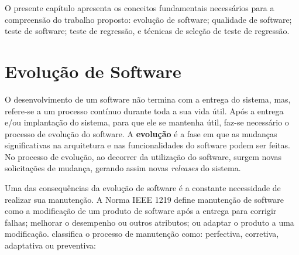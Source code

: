 
\acresetall 
O presente capítulo apresenta os conceitos fundamentais necessários para a compreensão do trabalho proposto: evolução de software; qualidade de software; teste de software; teste de regressão, e técnicas de seleção de teste de regressão.

\section{Evolução de Software}\label{sec:evolucaodesoftware}


O desenvolvimento de um software não termina com a entrega do sistema, mas, refere-se a um processo contínuo durante toda a sua vida útil. Após a entrega e/ou implantação do sistema, %
para que ele se mantenha útil, faz-se necessário o processo de evolução do software. A \textbf{evolução} é a fase em que as mudanças significativas na arquitetura e nas funcionalidades do software podem ser feitas. %
No processo de evolução, ao decorrer da utilização do software, surgem novas solicitações de mudança, gerando assim novas \textit{releases} do sistema.

Uma das consequências da evolução de software é a constante necessidade de realizar sua manutenção. A Norma IEEE 1219 \cite{257623} define manutenção de software como a modificação de um produto de software após a entrega para corrigir falhas; melhorar o desempenho ou outros atributos; ou adaptar o produto a uma modificação.  classifica o processo de manutenção como: perfectiva, corretiva, adaptativa ou preventiva:

